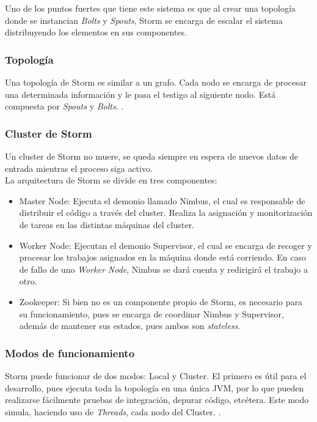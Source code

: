 	Uno de los puntos fuertes que tiene este sistema es que al crear una topología donde se instancian \textit{Bolts} y \textit{Spouts}, Storm se encarga de escalar el sistema distribuyendo los elementos en sus componentes.\\

	\subsubsection{Topología}

	Una topología de Storm es similar a un grafo. Cada nodo se encarga de procesar una determinada información y le pasa el testigo al siguiente nodo. Está compuesta por \textit{Spouts} y \textit{Bolts}. \cite{Storm}.\\

	\subsubsection{Cluster de Storm}

	Un cluster de Storm no muere, se queda siempre en espera de nuevos datos de entrada mientras el proceso siga activo.\\

	La arquitectura de Storm se divide en tres componentes:
	\begin{itemize}
	\item Master Node: Ejecuta el demonio llamado Nimbus, el cual es responsable de distribuir el código a través del cluster. Realiza la asignación y monitorización de tareas en las distintas máquinas del cluster.
	\item Worker Node: Ejecutan el demonio Supervisor, el cual se encarga de recoger y procesar los trabajos asignados en la máquina donde está corriendo. En caso de fallo de uno \textit{Worker Node}, Nimbus se dará cuenta y redirigirá el trabajo a otro.
	\item Zookeeper: Si bien no es un componente propio de Storm, es necesario para su funcionamiento, pues se encarga de coordinar Nimbus y Supervisor, además de mantener sus estados, pues ambos son \textit{stateless}.
	\end{itemize}

	\subsubsection{Modos de funcionamiento}

	Storm puede funcionar de dos modos: Local y Cluster. El primero es útil para el desarrollo, pues ejecuta toda la topología en una única JVM, por lo que pueden realizarse fácilmente pruebas de integración, depurar código, etcétera. Este modo simula, haciendo uso de \textit{Threads}, cada nodo del Cluster. \cite{Storm}.\\

